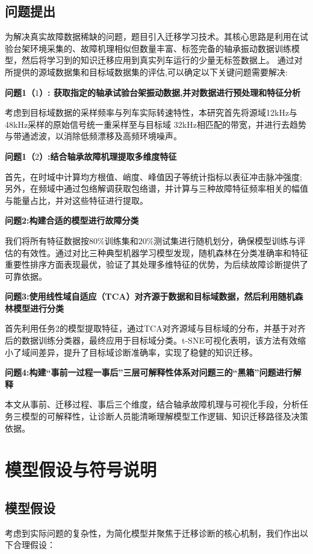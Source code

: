 \documentclass[a4paper]{CPIPC}
\numberwithin{equation}{section}
\begin{document}
\subsection{问题提出}
为解决真实故障数据稀缺的问题，题目引入迁移学习技术。其核心思路是利用在试验台架环境采集的、故障机理相似但数量丰富、标签完备的轴承振动数据训练模型，然后将学习到的知识迁移应用到真实列车运行的少量无标签数据上。
通过对所提供的源域数据集和目标域数据集的评估,可以确定以下关键问题需要解决:

\textbf{问题1（$1$）: 获取指定的轴承试验台架振动数据,并对数据进行预处理和特征分析}

考虑到目标域数据的采样频率与列车实际转速特性，本研究首先将源域12kHz与48kHz采样的原始信号统一重采样至与目标域 32kHz相匹配的带宽，并进行去趋势与带通滤波，以消除低频漂移及高频环境噪声。

\textbf{问题1（$2$）:结合轴承故障机理提取多维度特征}

首先，在时域中计算均方根值、峭度、峰值因子等统计指标以表征冲击脉冲强度;另外，在频域中通过包络解调获取包络谱，并计算与三种故障特征频率相关的幅值与能量占比，并对这些特征进行提取。



\textbf{问题2:构建合适的模型进行故障分类}

我们将所有特征数据按$80\%$训练集和$20\%$测试集进行随机划分，确保模型训练与评估的有效性。通过对比三种典型机器学习模型发现，随机森林在分类准确率和特征重要性排序方面表现最优，验证了其处理多维特征的优势，为后续故障诊断提供了可靠依据。

\textbf{问题3:使用线性域自适应（TCA）对齐源于数据和目标域数据，然后利用随机森林模型进行分类}

首先利用任务2的模型提取特征，通过TCA对齐源域与目标域的分布，并基于对齐后的数据训练分类器，最终应用于目标域分类。t-SNE可视化表明，该方法有效缩小了域间差异，提升了目标域诊断准确率，实现了稳健的知识迁移。


\textbf{问题4:构建“事前一过程一事后”三层可解释性体系对问题三的“黑箱”问题进行解释}

本文从事前、迁移过程、事后三个维度，结合轴承故障机理与可视化手段，分析任务三模型的可解释性，让诊断人员能清晰理解模型工作逻辑、知识迁移路径及决策依据。

\newpage


\section{模型假设与符号说明}
\subsection{模型假设}
考虑到实际问题的复杂性，为简化模型并聚焦于迁移诊断的核心机制，我们作出以下合理假设：
\end{document}
